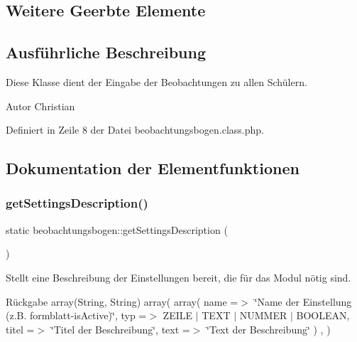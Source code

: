 \subsection*{Weitere Geerbte Elemente}


\subsection{Ausführliche Beschreibung}
Diese Klasse dient der Eingabe der Beobachtungen zu allen Schülern. \begin{DoxyAuthor}{Autor}
Christian 
\end{DoxyAuthor}


Definiert in Zeile 8 der Datei beobachtungsbogen.\+class.\+php.



\subsection{Dokumentation der Elementfunktionen}
\mbox{\label{classbeobachtungsbogen_a049bb9889085cdffb900789abd57f62e}} 
\subsubsection{\texorpdfstring{get\+Settings\+Description()}{getSettingsDescription()}}
{\footnotesize\ttfamily static beobachtungsbogen\+::get\+Settings\+Description (\begin{DoxyParamCaption}{ }\end{DoxyParamCaption})\hspace{0.3cm}{\ttfamily [static]}}

Stellt eine Beschreibung der Einstellungen bereit, die für das Modul nötig sind. \begin{DoxyReturn}{Rückgabe}
array(\+String, String) array( array( \textquotesingle{}name\textquotesingle{} =$>$ \char`\"{}\+Name der Einstellung (z.\+B. formblatt-\/is\+Active)\char`\"{}, \textquotesingle{}typ\textquotesingle{} =$>$ Z\+E\+I\+LE $\vert$ T\+E\+XT $\vert$ N\+U\+M\+M\+ER $\vert$ B\+O\+O\+L\+E\+AN, \textquotesingle{}titel\textquotesingle{} =$>$ \char`\"{}\+Titel der Beschreibung\char`\"{}, \textquotesingle{}text\textquotesingle{} =$>$ \char`\"{}\+Text der Beschreibung\char`\"{} ) , ) 
\end{DoxyReturn}



